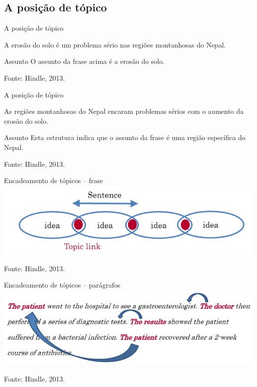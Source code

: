 \documentclass{beamer}
\begin{document}
\subsection{A posição de tópico}

\begin{frame}{A posição de tópico}
  \begin{example}
    A \alert<3->{erosão do solo} é um problema sério nas regiões
    montanhosas do Nepal.
  \end{example}
  \begin{block}{Assunto}
    O assunto da frase acima é a \alert<3->{erosão do solo}.
  \end{block}

  \vfill
  Fonte: Hindle, 2013.
\end{frame}

\begin{frame}{A posição de tópico}
  \begin{example}
    As \alert<3->{regiões montanhosas do Nepal} encaram problemas sérios com o
    aumento da erosão do solo.
  \end{example}
  \begin{block}{Assunto}
    Esta estrutura indica que o assunto da frase é \alert<3->{uma
      região específica} do Nepal.
  \end{block}

  \vfill
  Fonte: Hindle, 2013.
\end{frame}

\begin{frame}{Encadeamento de tópicos -- frase}
  \includegraphics[width=\textwidth]{Escrita/encadeamento1}

  \vfill
  Fonte: Hindle, 2013.
\end{frame}

\begin{frame}{Encadeamento de tópicos -- parágrafos}
    \includegraphics[width=\textwidth]{Escrita/encadeamento2}

  \vfill
  Fonte: Hindle, 2013.
\end{frame}
\end{document}
